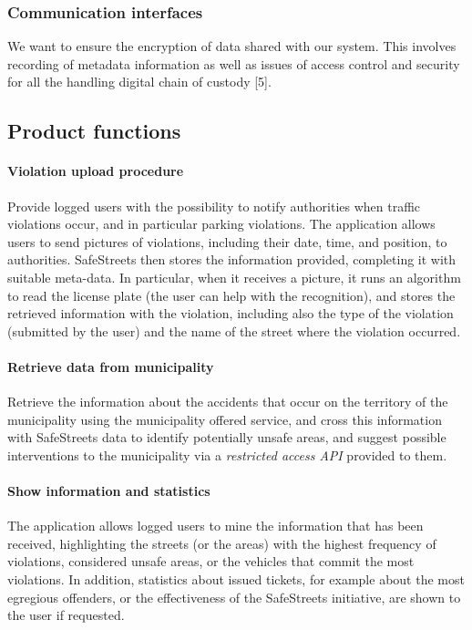\subsubsection{Communication interfaces}
	We want to ensure the encryption of data shared with our system. This involves recording of metadata information as well as issues of access control and security for all the handling digital chain of custody [5].

\subsection{Product functions}
\paragraph{Violation upload procedure} 
Provide logged users with the possibility to notify authorities when traffic violations occur, and in particular parking violations. The application allows users to send pictures of violations, including their date, time, and position, to authorities. 
SafeStreets then stores the information provided, completing it with suitable meta-­data. In particular, when it receives a picture, it runs an algorithm to read the license plate (the user can help with the recognition), and stores the retrieved information with the violation, including also the type of the violation (submitted by the user) and the name of the street where the violation occurred.

\paragraph{Retrieve data from municipality}
Retrieve the information about the accidents that occur on the territory of the municipality using the municipality offered service, and cross this information with SafeStreets data to identify potentially unsafe areas, and suggest possible interventions to the municipality via a \emph{restricted access API} provided to them.

\paragraph{Show information and statistics}
The application allows logged users to mine the information that has been received, highlighting the streets (or the areas) with the highest frequency of violations, considered unsafe areas, or the vehicles that commit the most violations. In addition, statistics about issued tickets, for example about the most egregious offenders, or the effectiveness of the SafeStreets initiative, are shown to the user if requested. 

